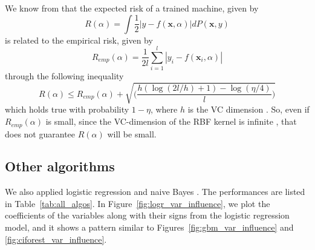 We know from \cite{Vapnik95} that the expected risk of a trained machine, given by
\begin{equation}
\label{eqn:risk}
R(\alpha) = \int\frac{1}{2}|y - f(\mathbf{x}, \alpha)|dP(\mathbf{x}, y)
\end{equation}
is related to the empirical risk, given by
\begin{equation}
\label{eqn:emp-risk}
R_{emp}(\alpha) = \frac{1}{2l}\sum_{i=1}^l|y_i - f({\mathbf{x}}_i, \alpha)|
\end{equation}
through the following inequality
\begin{equation}
\label{eqn:risk-relation}
R(\alpha) \le R_{emp}(\alpha) + \sqrt{\Bigg(\frac{h(\log(2l/h) + 1) - \log({\eta}/4)}{l}\Bigg)} 
\end{equation}
which holds true with probability $1 - \eta$, where $h$ is the VC dimension \cite{Vapnik95}. So, even if $R_{emp}(\alpha)$ is small, since the VC-dimension of the RBF kernel is infinite \cite{Burges98}, that does not guarantee $R(\alpha)$ will be small.

\subsection{Other algorithms}
\label{subsec:other_algos}
We also applied logistic regression \cite{stats} and naive Bayes \cite{e1071}. The performances are listed in Table~\ref{tab:all_algos}. In Figure~\ref{fig:logr_var_influence}, we plot the coefficients of the variables along with their signs from the logistic regression model, and it shows a pattern similar to Figures~\ref{fig:gbm_var_influence} and \ref{fig:ciforest_var_influence}.

